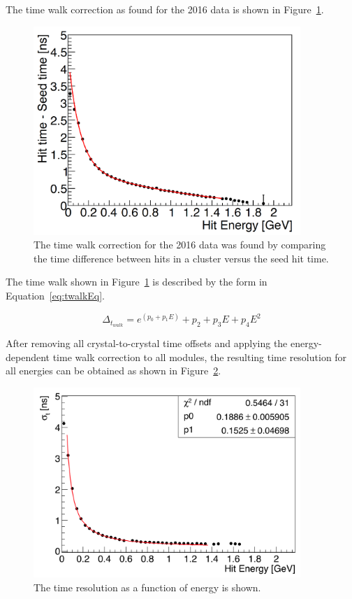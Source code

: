 \documentclass[12pt]{report}
\begin{document}
The time walk correction as found for the 2016 data is shown in Figure~\ref{Figure:twalk}. 

\begin{figure}[H]
  \centering
      \includegraphics[width=0.9\textwidth]{pics/performance/twalk2016.png}
  \caption[Time walk correction for the 2016 Ecal data]{The time walk correction for the 2016 data was found by comparing the time difference between hits in a cluster versus the seed hit time.}
  \label{Figure:twalk}
\end{figure}

The time walk shown in Figure~\ref{Figure:twalk} is described by the form in Equation~\eqref{eq:twalkEq}.

\begin{equation}
	\label{eq:twalkEq}
		\Delta_{t_{walk}} = e^(p_0+p_1E)+p_2+p_3E+p_4E^2	
\end{equation}

After removing all crystal-to-crystal time offsets and applying the energy-dependent time walk correction to all modules, the resulting time resolution for all energies can be obtained as shown in Figure~\ref{Figure:timeRes}. 

\begin{figure}[H]
  \centering
      \includegraphics[width=0.9\textwidth]{pics/performance/timeRes2016.png}
  \caption[Time resolution of the Ecal for the 2016 run ]{The time resolution as a function of energy is shown.}
  \label{Figure:timeRes}
\end{figure}
\end{document}
